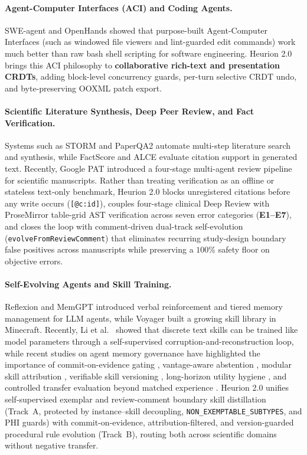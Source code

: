 \documentclass[11pt,a4paper]{article}
\begin{document}
\paragraph{Agent-Computer Interfaces (ACI) and Coding Agents.}
SWE-agent \cite{yang2024sweagent} and OpenHands \cite{wang2024openhands} showed that purpose-built Agent-Computer Interfaces (such as windowed file viewers and lint-guarded edit commands) work much better than raw bash shell scripting for software engineering. Heurion 2.0 brings this ACI philosophy to \textbf{collaborative rich-text and presentation CRDTs}, adding block-level concurrency guards, per-turn selective CRDT undo, and byte-preserving OOXML patch export.

\paragraph{Scientific Literature Synthesis, Deep Peer Review, and Fact Verification.}
Systems such as STORM \cite{shao2024storm} and PaperQA2 \cite{skarlinski2024paperqa2} automate multi-step literature search and synthesis, while FactScore \cite{min2023factscore} and ALCE \cite{gao2023alce} evaluate citation support in generated text. Recently, Google PAT \cite{googlepat2026} introduced a four-stage multi-agent review pipeline for scientific manuscripts. Rather than treating verification as an offline or stateless text-only benchmark, Heurion 2.0 blocks unregistered citations before any write occurs (\texttt{[@c:id]}), couples four-stage clinical Deep Review with ProseMirror table-grid AST verification across seven error categories (\textbf{E1--E7}), and closes the loop with comment-driven dual-track self-evolution (\texttt{evolveFromReviewComment}) that eliminates recurring study-design boundary false positives across manuscripts while preserving a $100\%$ safety floor on objective errors.

\paragraph{Self-Evolving Agents and Skill Training.}
Reflexion \cite{shinn2023reflexion} and MemGPT \cite{packer2023memgpt} introduced verbal reinforcement and tiered memory management for LLM agents, while Voyager \cite{wang2023voyager} built a growing skill library in Minecraft. Recently, Li et al.\ \cite{li2026skilltraining} showed that discrete text skills can be trained like model parameters through a self-supervised corruption-and-reconstruction loop, while recent studies on agent memory governance have highlighted the importance of commit-on-evidence gating \cite{coem2026}, vantage-aware abstention \cite{safevantage2026}, modular skill attribution \cite{memskill2026}, verifiable skill versioning \cite{skillv2026}, long-horizon utility hygiene \cite{msce2026}, and controlled transfer evaluation beyond matched experience \cite{memtransfer2026}. Heurion 2.0 unifies self-supervised exemplar and review-comment boundary skill distillation (Track~A, protected by instance--skill decoupling, \texttt{NON\_EXEMPTABLE\_SUBTYPES}, and PHI guards) with commit-on-evidence, attribution-filtered, and version-guarded procedural rule evolution (Track~B), routing both across scientific domains without negative transfer.
\end{document}
